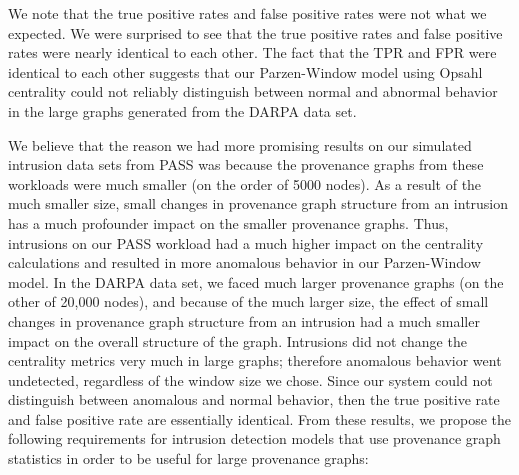 \documentclass[10pt,twocolumn]{article}
\begin{document}
We note that the true positive rates and false positive rates were not what we expected. We were surprised to see that the true positive rates and false positive rates were nearly identical to each other. The fact that the TPR and FPR were identical to each other suggests that our Parzen-Window model using Opsahl centrality could not reliably distinguish between normal and abnormal behavior in the large graphs generated from the DARPA data set. 

We believe that the reason we had more promising results on our simulated intrusion data sets from PASS was because the provenance graphs from these workloads were much smaller (on the order of 5000 nodes). As a result of the much smaller size, small changes in provenance graph structure from an intrusion has a much profounder impact on the smaller provenance graphs. Thus, intrusions on our PASS workload had a much higher impact on the centrality calculations and resulted in more anomalous behavior in our Parzen-Window model. In the DARPA data set, we faced much larger provenance graphs (on the other of 20,000 nodes), and because of the much larger size, the effect of small changes in provenance graph structure from an intrusion had a much smaller impact on the overall structure of the graph. Intrusions did not change the centrality metrics very much in large graphs; therefore anomalous behavior went undetected, regardless of the window size we chose. Since our system could not distinguish between anomalous and normal behavior, then the true positive rate and false positive rate are essentially identical. From these results, we propose the following requirements for intrusion detection models that use provenance graph statistics in order to be useful for large provenance graphs:
\end{document}
